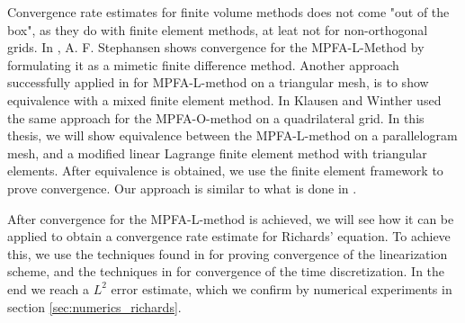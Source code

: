 \documentclass[../Main/main.tex]{subfiles}
\begin{document}
Convergence rate estimates for finite volume methods does not come "out of the box", as they do with finite element methods, at leat not for non-orthogonal grids. In \cite{Stephansen2012ConvergenceOT}, A. F. Stephansen shows convergence for the MPFA-L-Method by formulating it as a mimetic finite difference method. Another approach successfully applied in \cite{https://doi.org/10.1002/fld.1787} for MPFA-L-method on a triangular mesh, is to show equivalence with a mixed finite element method. In \cite{klausen2006robust} Klausen and Winther used the same approach for the MPFA-O-method on a quadrilateral grid. In this thesis, we will show equivalence between the MPFA-L-method on a parallelogram mesh, and a modified linear Lagrange finite element method with triangular elements. After equivalence is obtained, we use the finite element framework to prove convergence. Our approach is similar to what is done in \cite{https://doi.org/10.1002/num.20525}. 
\par
After convergence for the MPFA-L-method is achieved, we will see how it can be applied to obtain a convergence rate estimate for Richards' equation. To achieve this, we use the techniques found in \cite{list2016study} for proving convergence of the linearization scheme, and the techniques in \cite{FlorinTimeConvergence,Pop2002} for convergence of the time discretization. In the end we reach a $L^2$ error estimate, which we confirm by numerical experiments in section \ref{sec:numerics_richards}.
\end{document}
